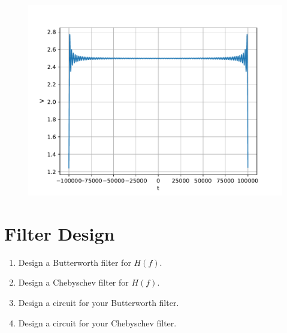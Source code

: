 \documentclass[journal,12pt,twocolumn]{IEEEtran}
\renewcommand\thesection{\arabic{section}}
\begin{document}
\begin{enumerate}[label=\thesection.\arabic*
,ref=\thesection.\theenumi]
\begin{figure}[!ht]
\begin{center}
		\includegraphics[width=\columnwidth]{./figs/e4.3.pdf}
	\end{center}
	\label{fig:}	
\end{figure}
\end{enumerate}
\section{Filter Design}
\begin{enumerate}[label=\thesection.\arabic*
,ref=\thesection.\theenumi]
\item Design a Butterworth filter for $H(f)$.
\item Design a Chebyschev filter for $H(f)$.
\item Design a circuit for your Butterworth filter.
\item Design a circuit for your Chebyschev filter.
\end{enumerate}
\end{document}
